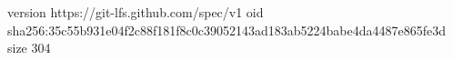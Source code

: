 version https://git-lfs.github.com/spec/v1
oid sha256:35c55b931e04f2c88f181f8c0c39052143ad183ab5224babe4da4487e865fe3d
size 304
